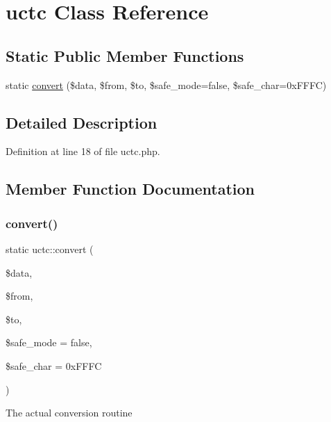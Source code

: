 \hypertarget{classuctc}{}\section{uctc Class Reference}
\label{classuctc}
\subsection*{Static Public Member Functions}
\begin{DoxyCompactItemize}
\item 
static \hyperlink{classuctc_ae0606c0be3e12ff1184b52a463754a86}{convert} (\$data, \$from, \$to, \$safe\+\_\+mode=false, \$safe\+\_\+char=0x\+F\+F\+F\+C)
\end{DoxyCompactItemize}


\subsection{Detailed Description}


Definition at line 18 of file uctc.\+php.



\subsection{Member Function Documentation}
\hypertarget{classuctc_ae0606c0be3e12ff1184b52a463754a86}{}\label{classuctc_ae0606c0be3e12ff1184b52a463754a86} 
\subsubsection{\texorpdfstring{convert()}{convert()}}
{\footnotesize\ttfamily static uctc\+::convert (\begin{DoxyParamCaption}\item[{}]{\$data,  }\item[{}]{\$from,  }\item[{}]{\$to,  }\item[{}]{\$safe\+\_\+mode = {\ttfamily false},  }\item[{}]{\$safe\+\_\+char = {\ttfamily 0xFFFC} }\end{DoxyParamCaption})\hspace{0.3cm}{\ttfamily [static]}}

The actual conversion routine


